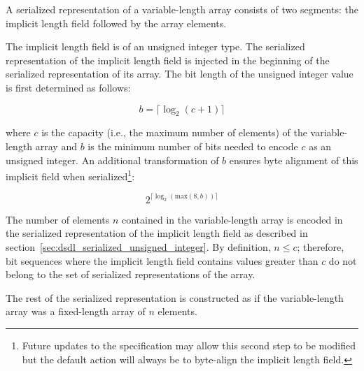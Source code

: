 A serialized representation of a variable-length array consists of two segments:
the implicit length field followed by the array elements.

The implicit length field is of an unsigned integer type.
The serialized representation of the implicit length field
is injected in the beginning of the serialized representation of its array.
The bit length of the unsigned integer value is first determined as follows:

$$b=\lceil{}\log_2 (c + 1)\rceil{}$$

where $c$ is the capacity (i.e., the maximum number of elements) of the variable-length array and
$b$ is the minimum number of bits needed to encode $c$ as an unsigned integer. An additional transformation
of $b$ ensures byte alignment of this implicit field when serialized\footnote{Future updates to the specification
may allow this second step to be modified but the default action will always be to byte-align the implicit
length field.}:

$$2^{\lceil{}\log_2 (\text{max}(8, b))\rceil{}}$$

The number of elements $n$ contained in the variable-length array is encoded
in the serialized representation of the implicit length field
as described in section~\ref{sec:dsdl_serialized_unsigned_integer}.
By definition, $n \leq c$; therefore, bit sequences where the implicit length field contains values
greater than $c$ do not belong to the set of serialized representations of the array.

The rest of the serialized representation is constructed as if the variable-length array was
a fixed-length array of $n$ elements.

